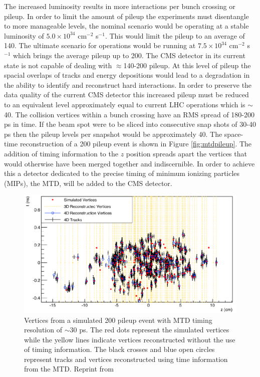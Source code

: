 The increased luminosity results in more interactions per bunch crossing or pileup.  In order to limit the amount of pileup the experiments must disentangle to more manageable levels, the nominal scenario would be operating at a stable luminosity of $5.0\times10^{34}$ cm$^{-2}$ s$^{-1}$.  This would limit the pileup to an average of 140.  The ultimate scenario for operations would be running at $7.5\times10^{34}$ cm$^{-2}$ s$^{-1}$ which brings the average pileup up to 200.  The CMS detector in its current state is not capable of dealing with $\approx$140-200 pileup.  At this level of pileup the spacial overlaps of tracks and energy depositions would lead to a degradation in the ability to identify and reconstruct hard interactions. In order to preserve the data quality of the current CMS detector this increased pileup must be reduced to an equivalent level approximately equal to current LHC operations which is $\sim$40.  The collision vertices within a bunch crossing have an RMS spread of 180-200 ps in time.  If the beam spot were to be sliced into consecutive snap shots of 30-40 ps then the pileup levels per snapshot would be approximately 40.  The space-time reconstruction of a 200 pileup event is shown in Figure \ref{fig:mtdpileup}.  The addition of timing information to the $z$ position spreads apart the vertices that would otherwise have been merged together and indiscernible.  In order to achieve this a detector dedicated to the precise timing of minimum ionizing particles (MIPs), the MTD, will be added to the CMS detector.  



\begin{figure}[h]
	\centering
	\includegraphics[width=1.0\linewidth]{Figures/MDT_pileup}
	\caption{Vertices from a simulated 200 pileup event with MTD timing resolution of $\sim$30 ps. The red dots represent the simulated vertices while the yellow lines indicate vertices reconstructed without the use of timing information. The black crosses and blue open circles represent tracks and vertices reconstructed using time information from the MTD. Reprint from}
	\label{fig:mdtpileup}
\end{figure}

